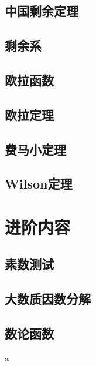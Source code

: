 \documentclass{article}
\begin{document}
	\subsection{中国剩余定理}
	
	\subsection{剩余系}
	
	\subsection{欧拉函数}
	
	\subsection{欧拉定理}
	
	\subsection{费马小定理}
	
	\subsection{Wilson定理}
	
	\section{进阶内容}
	
	\subsection{素数测试}
	
	\subsection{大数质因数分解}
	
	\subsection{数论函数}

	a
\end{document}
